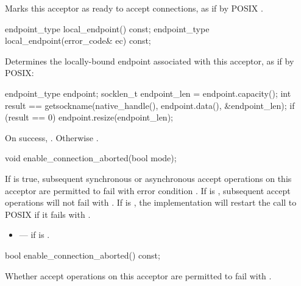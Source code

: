 \begin{itemdescr}
\pnum
\effects Marks this acceptor as ready to accept connections, as if by POSIX .
\end{itemdescr}

\begin{itemdecl}
endpoint_type local_endpoint() const;
endpoint_type local_endpoint(error_code& ec) const;
\end{itemdecl}

\begin{itemdescr}
\pnum
\effects Determines the locally-bound endpoint associated with this acceptor, as if by POSIX: 
\begin{codeblock}
endpoint_type endpoint;
socklen_t endpoint_len = endpoint.capacity();
int result == getsockname(native_handle(), endpoint.data(), &endpoint_len);
if (result == 0)
  endpoint.resize(endpoint_len);
\end{codeblock}


\pnum
\returns On success, . Otherwise .
\end{itemdescr}

\begin{itemdecl}
void enable_connection_aborted(bool mode);
\end{itemdecl}

\begin{itemdescr}
\pnum
\effects If  is true, subsequent synchronous or asynchronous accept operations on this acceptor are permitted to fail with error condition . If  is , subsequent accept operations will not fail with . \enternote If  is , the implementation will restart the call to POSIX  if it fails with . \exitnote

\pnum
\errors
\begin{itemize}
\item
{} --- if  is .
\end{itemize}
\end{itemdescr}

\begin{itemdecl}
bool enable_connection_aborted() const;
\end{itemdecl}

\begin{itemdescr}
\pnum
\returns Whether accept operations on this acceptor are permitted to fail with .
\end{itemdescr}

